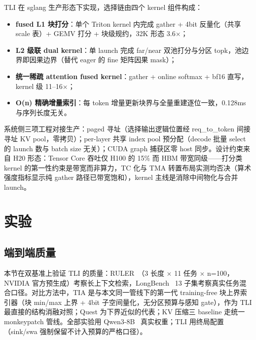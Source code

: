 \documentclass[11pt]{article}
\begin{document}
TLI 在 sglang 生产形态下实现，选择链由四个 kernel 组件构成：
\begin{itemize}
\item \textbf{fused L1 块打分}：单个 Triton kernel 内完成 gather + 4bit 反量化（共享 scale 表）+ GEMV 打分 + 块级规约，32K 形态 3.6$\times$；
\item \textbf{L2 级联 dual kernel}：单 launch 完成 far/near 双池打分与分区 topk，池边界即因果边界（替代 eager 的 fine 矩阵因果 mask）；
\item \textbf{统一稀疏 attention fused kernel}：gather + online softmax + bf16 直写，kernel 级 11--16$\times$；
\item \textbf{O(n) 精确增量索引}：每 token 增量更新块界与全量重建逐位一致，0.128ms 与序列长度无关。
\end{itemize}
系统侧三项工程对接生产：paged 寻址（选择输出逻辑位置经 req\_to\_token 间接寻址 KV pool，零拷贝）；per-layer 共享 index pool 预分配（decode 批量 select 的 launch 数与 batch size 无关）；CUDA graph 捕获区零 host 同步。设计约束来自 H20 形态：Tensor Core 吞吐仅 H100 的 15\% 而 HBM 带宽同级——打分类 kernel 的第一性约束是带宽而非算力，TC 化与 TMA 转置布局实测均否决（算术强度指标显示纯 gather 路径已带宽饱和），kernel 主线是消除中间物化与合并 launch。

\section{实验}

\subsection{端到端质量}

本节在双基准上验证 TLI 的质量：RULER~\cite{ruler}（3 长度 $\times$ 11 任务 $\times$ n=100，NVIDIA 官方预生成）考察长上下文检索，LongBench~\cite{longbench} 13 子集考察真实任务混合口径。对比方法中，TIA 是与本文同一管线下的第一代 training-free 块上界索引器（块 min/max 上界 + 4bit 子空间量化，无分区预算与感知 gate），作为 TLI 最直接的结构消融对照；Quest 为下界近似的代表；KV 压缩三 baseline 走统一 monkeypatch 管线。全部实验用 Qwen3-8B~\cite{qwen3} 真实权重；TLI 用终局配置（sink/swa 强制保留不计入预算的严格口径）。
\end{document}

